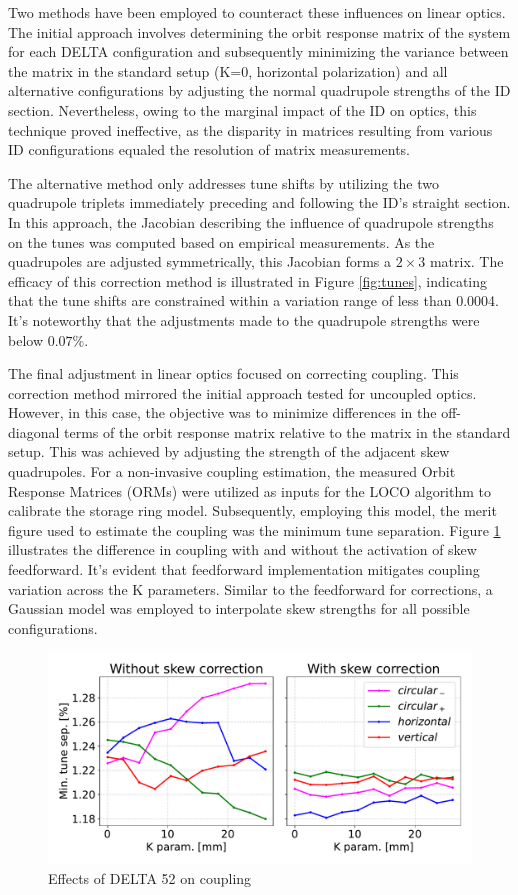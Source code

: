 \documentclass[a4paper,
               keeplastbox,   %
               ]{jacow}
\begin{document}
Two methods have been employed to counteract these influences on linear optics. The initial approach involves determining the orbit response matrix of the system for each DELTA configuration and subsequently minimizing the variance between the matrix in the standard setup (K=0, horizontal polarization) and all alternative configurations by adjusting the normal quadrupole strengths of the ID section. Nevertheless, owing to the marginal impact of the ID on optics, this technique proved ineffective, as the disparity in matrices resulting from various ID configurations equaled the resolution of matrix measurements.

The alternative method only addresses tune shifts by utilizing the two quadrupole triplets immediately preceding and following the ID's straight section. In this approach, the Jacobian describing the influence of quadrupole strengths on the tunes was computed based on empirical measurements. As the quadrupoles are adjusted symmetrically, this Jacobian forms a $2 \times 3$ matrix. The efficacy of this correction method is illustrated in Figure \ref{fig:tunes}, indicating that the tune shifts are constrained within a variation range of less than 0.0004. It's noteworthy that the adjustments made to the quadrupole strengths were below $0.07\%$.

The final adjustment in linear optics focused on correcting coupling. This correction method mirrored the initial approach tested for uncoupled optics. However, in this case, the objective was to minimize differences in the off-diagonal terms of the orbit response matrix relative to the matrix in the standard setup. This was achieved by adjusting the strength of the adjacent skew quadrupoles. For a non-invasive coupling estimation, the measured Orbit Response Matrices (ORMs) were utilized as inputs for the LOCO algorithm \cite{Safranek} to calibrate the storage ring model. Subsequently, employing this model, the merit figure used to estimate the coupling was the minimum tune separation. Figure \ref{fig:coupling} illustrates the difference in coupling with and without the activation of skew feedforward. It's evident that feedforward implementation mitigates coupling variation across the K parameters. Similar to the feedforward for corrections, a Gaussian model was employed to interpolate skew strengths for all possible configurations.
 
\begin{figure}[!h]
    \centering
   \includegraphics[width=\columnwidth]{coupling.pdf}
   \caption{Effects of DELTA 52 on coupling}
   \label{fig:coupling}
\end{figure}
\end{document}
